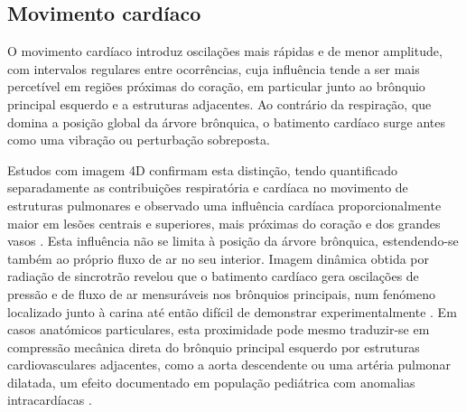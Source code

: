 \subsection{Movimento cardíaco}
O movimento cardíaco introduz oscilações mais rápidas e de menor amplitude, com intervalos regulares entre ocorrências, cuja influência tende a ser mais percetível em regiões próximas do coração, em particular junto ao brônquio principal esquerdo e a estruturas adjacentes. Ao contrário da respiração, que domina a posição global da árvore brônquica, o batimento cardíaco surge antes como uma vibração ou perturbação sobreposta.

Estudos com imagem 4D confirmam esta distinção, tendo quantificado separadamente as contribuições respiratória e cardíaca no movimento de estruturas pulmonares e observado uma influência cardíaca proporcionalmente maior em lesões centrais e superiores, mais próximas do coração e dos grandes vasos \parencite{Savanovic2023}. Esta influência não se limita à posição da árvore brônquica, estendendo-se também ao próprio fluxo de ar no seu interior. Imagem dinâmica obtida por radiação de sincrotrão revelou que o batimento cardíaco gera oscilações de pressão e de fluxo de ar mensuráveis nos brônquios principais, num fenómeno localizado junto à carina até então difícil de demonstrar experimentalmente \parencite{Dubsky2018}. Em casos anatómicos particulares, esta proximidade pode mesmo traduzir-se em compressão mecânica direta do brônquio principal esquerdo por estruturas cardiovasculares adjacentes, como a aorta descendente ou uma artéria pulmonar dilatada, um efeito documentado em população pediátrica com anomalias intracardíacas \parencite{Ando2024}.

